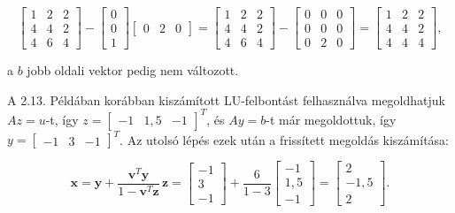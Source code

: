 \documentclass[
  magyar,
  11pt]{article}
\providecommand{\boldsymbol}[1]{\mathbf{#1}}
\begin{document}
\[\begin{bmatrix} 1 & 2 & 2 \\ 4 & 4 & 2 \\ 4 & 6 & 4 \end{bmatrix} - \begin{bmatrix} 0 \\ 0 \\ 1 \end{bmatrix} \begin{bmatrix} 0 & 2 & 0 \end{bmatrix} = \begin{bmatrix} 1 & 2 & 2 \\ 4 & 4 & 2 \\ 4 & 6 & 4 \end{bmatrix} - \begin{bmatrix} 0 & 0 & 0 \\ 0 & 0 & 0 \\ 0 & 2 & 0 \end{bmatrix} = \begin{bmatrix} 1 & 2 & 2 \\ 4 & 4 & 2 \\ 4 & 4 & 4 \end{bmatrix},\]

a \(b\) jobb oldali vektor pedig nem változott.

A 2.13. Példában korábban kiszámított LU-felbontást felhasználva
megoldhatjuk \(Az = u\)-t, így
\(z = \begin{bmatrix} -1 & 1{,}5 & -1 \end{bmatrix}^T\), és \(Ay = b\)-t
már megoldottuk, így
\(y = \begin{bmatrix} -1 & 3 & -1 \end{bmatrix}^T\). Az utolsó lépés
ezek után a frissített megoldás kiszámítása:

\[\boldsymbol{x} = \boldsymbol{y} + \frac{\boldsymbol{v}^T \boldsymbol{y}}{1 - \boldsymbol{v}^T \boldsymbol{z}} \, \boldsymbol{z} = \begin{bmatrix} -1 \\ 3 \\ -1 \end{bmatrix} + \frac{6}{1 - 3} \begin{bmatrix} -1 \\ 1{,}5 \\ -1 \end{bmatrix} = \begin{bmatrix} 2 \\ -1{,}5 \\ 2 \end{bmatrix}.\]
\end{document}
